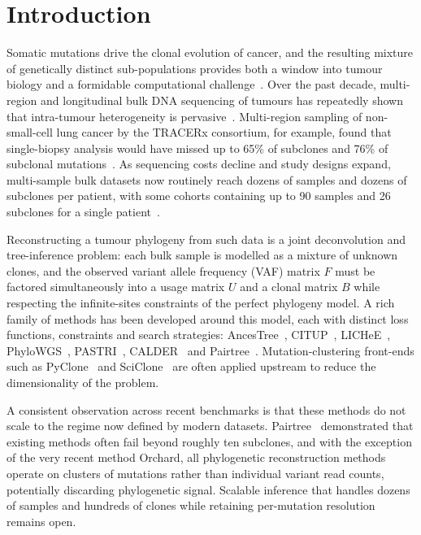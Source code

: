 
\section{Introduction}

Somatic mutations drive the clonal evolution of cancer, and the resulting mixture of genetically distinct sub-populations provides both a window into tumour biology and a formidable computational challenge~\cite{nowell1976clonal,mcgranahan2017clonal}. Over the past decade, multi-region and longitudinal bulk DNA sequencing of tumours has repeatedly shown that intra-tumour heterogeneity is pervasive~\cite{gerlinger2012intratumor,nikzainal2012life,jamalhanjani2017tracking}. Multi-region sampling of non-small-cell lung cancer by the TRACERx consortium, for example, found that single-biopsy analysis would have missed up to 65\% of subclones and 76\% of subclonal mutations~\cite{jamalhanjani2017tracking}. As sequencing costs decline and study designs expand, multi-sample bulk datasets now routinely reach dozens of samples and dozens of subclones per patient, with some cohorts containing up to 90 samples and 26 subclones for a single patient~\cite{wintersinger2022pairtree}.

Reconstructing a tumour phylogeny from such data is a joint deconvolution and tree-inference problem: each bulk sample is modelled as a mixture of unknown clones, and the observed variant allele frequency (VAF) matrix $F$ must be factored simultaneously into a usage matrix $U$ and a clonal matrix $B$ while respecting the infinite-sites constraints of the perfect phylogeny model. A rich family of methods has been developed around this model, each with distinct loss functions, constraints and search strategies: AncesTree~\cite{elkebir2015reconstruction}, CITUP~\cite{malikic2015citup}, LICHeE~\cite{popic2015lichee}, PhyloWGS~\cite{deshwar2015phylowgs}, PASTRI~\cite{satas2017pastri}, CALDER~\cite{myers2019calder} and Pairtree~\cite{wintersinger2022pairtree}. Mutation-clustering front-ends such as PyClone~\cite{roth2014pyclone} and SciClone~\cite{miller2014sciclone} are often applied upstream to reduce the dimensionality of the problem.

A consistent observation across recent benchmarks is that these methods do not scale to the regime now defined by modern datasets. Pairtree~\cite{wintersinger2022pairtree} demonstrated that existing methods often fail beyond roughly ten subclones, and with the exception of the very recent method Orchard, all phylogenetic reconstruction methods operate on clusters of mutations rather than individual variant read counts, potentially discarding phylogenetic signal. Scalable inference that handles dozens of samples and hundreds of clones while retaining per-mutation resolution remains open.

